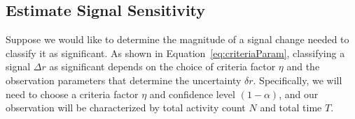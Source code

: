 \documentclass{article}
\begin{document}
%
%
%



\subsection{Estimate Signal Sensitivity}

Suppose we would like to determine the magnitude of a signal change needed to 
classify it as significant. As shown in Equation~\ref{eq:criteriaParam}, 
classifying a signal $\Delta r$ as significant depends on the choice of criteria factor 
$\eta$ and the observation parameters that determine the uncertainty $\delta r$. 
Specifically, we will need to choose a criteria factor $\eta$ and confidence level 
$(1-\alpha)$, and our observation will be characterized by total activity count $N$ 
and total time $T$.
\end{document}
